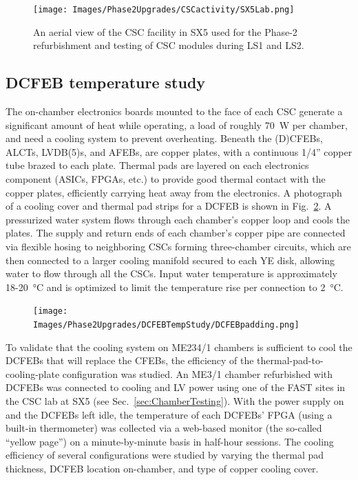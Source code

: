 \begin{figure}[H]
    \centering
    {\texttt{[image: Images/Phase2Upgrades/CSCactivity/SX5Lab.png]}}
    \caption{An aerial view of the CSC facility in SX5 used for the Phase-2 refurbishment and testing of CSC modules during LS1 and LS2.}
    \label{fig:SX5}
\end{figure}

\subsection{DCFEB temperature study} \label{sec:DCFEBTemperatureStudy}
The on-chamber electronics boards mounted to the face of each CSC generate a significant amount of heat while operating, a load of roughly \SI{70}{W} per chamber, and need a cooling system to prevent overheating. Beneath the (D)CFEBs, ALCTs, LVDB(5)s, and AFEBs, are copper plates, with a continuous 1/4'' copper tube brazed to each plate. Thermal pads are layered on each electronics component (ASICs, FPGAs, etc.) to provide good thermal contact with the copper plates, efficiently carrying heat away from the electronics. A photograph of a cooling cover and thermal pad strips for a DCFEB is shown in Fig.~\ref{fig:CoolingCover}. A pressurized water system flows through each chamber's copper loop and cools the plates. The supply and return ends of each chamber's copper pipe are connected via flexible hosing to neighboring CSCs forming three-chamber circuits, which are then connected to a larger cooling manifold secured to each YE disk, allowing water to flow through all the CSCs. Input water temperature is approximately 18-\SI{20}{\celsius} and is optimized to limit the temperature rise per connection to \SI{2}{\celsius}.

\begin{figure}[H]
    \centering
    {\texttt{[image: Images/Phase2Upgrades/DCFEBTempStudy/DCFEBpadding.png]}}
    \caption{}
    \label{fig:CoolingCover}
\end{figure}

To validate that the cooling system on ME234/1 chambers is sufficient to cool the DCFEBs that will replace the CFEBs, the efficiency of the thermal-pad-to-cooling-plate configuration was studied. An ME3/1 chamber refurbished with DCFEBs was connected to cooling and LV power using one of the FAST sites in the CSC lab at SX5 (see Sec.~\ref{sec:ChamberTesting}). With the power supply on and the DCFEBs left idle, the temperature of each DCFEBs' FPGA (using a built-in thermometer) was collected via a web-based monitor (the so-called ``yellow page'') on a minute-by-minute basis in half-hour sessions. The cooling efficiency of several configurations were studied by varying the thermal pad thickness, DCFEB location on-chamber, and type of copper cooling cover. 

